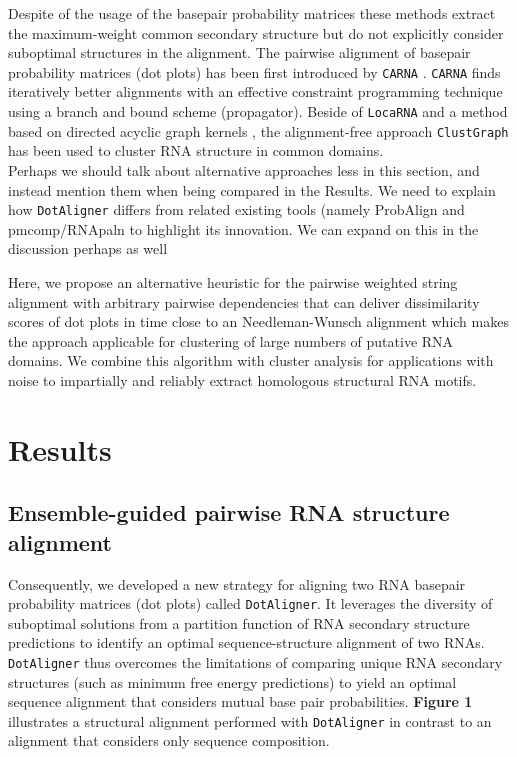 \documentclass[a4paper,11pt]{article}
\newcommand\dotaligner{\texttt{DotAligner}}
\newcommand\clustgraph{\texttt{ClustGraph}}
\newcommand\locarna{\texttt{LocaRNA}}
\newcommand\carna{\texttt{CARNA}}
\begin{document}
Despite of the usage of the basepair probability
matrices these methods extract the maximum-weight common secondary structure but
do not explicitly consider suboptimal structures in the alignment. The pairwise
alignment of basepair probability matrices (dot plots) has been first introduced
by \carna{} \cite{Palu2010,Sorescu2012}. \carna{} finds iteratively better
alignments with an effective constraint programming technique using a branch and
bound scheme (propagator). Beside of \locarna{} and a method based on directed 
acyclic graph kernels \cite{Sato18647390}, the alignment-free approach \clustgraph{}
\cite{Heyne22689765} has been used to cluster RNA structure in common domains.\\

{\color{red} Perhaps we should talk about alternative approaches less in this section, 
and instead mention them when being compared in the Results. We need to explain
how \dotaligner{} differs from related existing tools (namely ProbAlign and pmcomp/RNApaln
to highlight its innovation. We can expand on this in the discussion perhaps as well}

Here, we propose an alternative heuristic for the pairwise weighted string
alignment with arbitrary pairwise dependencies that can deliver dissimilarity
scores of dot plots in time close to an Needleman-Wunsch alignment which makes
the approach applicable for clustering of large numbers of putative RNA domains.
We combine this algorithm with cluster analysis for applications with 
noise to impartially and reliably extract homologous structural RNA motifs. \\ 

\section{ Results }
\subsection*{ Ensemble-guided pairwise RNA structure alignment} 
 
Consequently, we developed a new strategy for aligning two RNA 
basepair probability matrices (dot plots) called \dotaligner{}. It leverages the diversity of 
suboptimal solutions from a partition function of RNA secondary structure 
predictions to identify an optimal sequence-structure alignment of two RNAs. 
\dotaligner{} thus overcomes the limitations of comparing unique RNA 
secondary structures (such as minimum free energy predictions) to yield 
an optimal sequence alignment that considers mutual base pair probabilities.
\textbf{Figure 1} illustrates a structural alignment performed with \dotaligner{}
in contrast to an alignment that considers only sequence composition.\\
\end{document}
